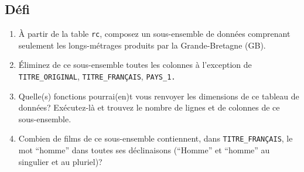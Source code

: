 \documentclass[
  letterpaper,
  DIV=11,
  numbers=noendperiod]{scrartcl}
\providecommand{\tightlist}{%
  \setlength{\itemsep}{0pt}\setlength{\parskip}{0pt}}\usepackage{longtable,booktabs,array}
\begin{document}
\hypertarget{duxe9fi}{%
\subsection{Défi}\label{duxe9fi}}

\begin{enumerate}
\def\labelenumi{\arabic{enumi}.}
\tightlist
\item
  À partir de la table \texttt{rc}, composez un sous-ensemble de données
  comprenant seulement les longs-métrages produits par la
  Grande-Bretagne (GB).
\item
  Éliminez de ce sous-ensemble toutes les colonnes à l'exception de
  \texttt{TITRE\_ORIGINAL}, \texttt{TITRE\_FRANÇAIS}, \texttt{PAYS\_1.}
\item
  Quelle(s) fonctions pourrai(en)t vous renvoyer les dimensions de ce
  tableau de données? Exécutez-là et trouvez le nombre de lignes et de
  colonnes de ce sous-ensemble.
\item
  Combien de films de ce sous-ensemble contiennent, dans
  \texttt{TITRE\_FRANÇAIS}, le mot ``homme'' dans toutes ses
  déclinaisons (``Homme'' et ``homme'' au singulier et au pluriel)?
\end{enumerate}
\end{document}
